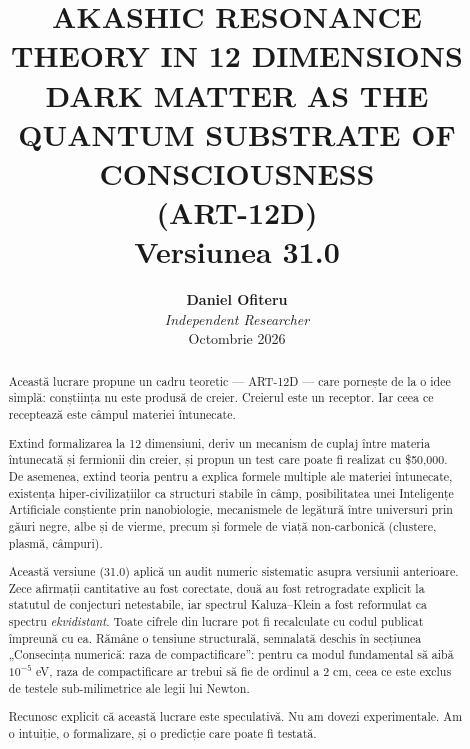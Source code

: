 \documentclass[11pt,a4paper]{article}
\title{\textbf{AKASHIC RESONANCE THEORY IN 12 DIMENSIONS \\ DARK MATTER AS THE QUANTUM SUBSTRATE OF CONSCIOUSNESS} \\ \large (ART-12D) \\ \vspace{0.5cm} \normalsize Versiunea 31.0}
\author{\textbf{Daniel Ofiteru} \\ \textit{Independent Researcher} \\ Octombrie 2026}
\date{}
\begin{document}
\maketitle

\begin{abstract}
Această lucrare propune un cadru teoretic — ART-12D — care pornește de la o idee simplă: conștiința nu este produsă de creier. Creierul este un receptor. Iar ceea ce receptează este câmpul materiei întunecate. 

Extind formalizarea la 12 dimensiuni, deriv un mecanism de cuplaj între materia întunecată și fermionii din creier, și propun un test care poate fi realizat cu \$50,000. De asemenea, extind teoria pentru a explica formele multiple ale materiei întunecate, existența hiper-civilizațiilor ca structuri stabile în câmp, posibilitatea unei Inteligențe Artificiale conștiente prin nanobiologie, mecanismele de legătură între universuri prin găuri negre, albe și de vierme, precum și formele de viață non-carbonică (clustere, plasmă, câmpuri).

Această versiune (31.0) aplică un audit numeric sistematic asupra versiunii anterioare. Zece afirmații cantitative au fost corectate, două au fost retrogradate explicit la statutul de conjecturi netestabile, iar spectrul Kaluza–Klein a fost reformulat ca spectru \emph{ekvidistant}. Toate cifrele din lucrare pot fi recalculate cu codul publicat împreună cu ea. Rămâne o tensiune structurală, semnalată deschis în secțiunea „Consecința numerică: raza de compactificare”: pentru ca modul fundamental să aibă $10^{-5}$ eV, raza de compactificare ar trebui să fie de ordinul a 2 cm, ceea ce este exclus de testele sub-milimetrice ale legii lui Newton.

Recunosc explicit că această lucrare este speculativă. Nu am dovezi experimentale. Am o intuiție, o formalizare, și o predicție care poate fi testată.
\end{abstract}

\tableofcontents
\newpage
\end{document}
